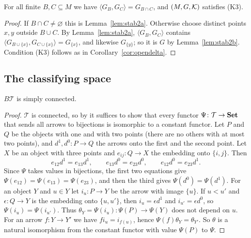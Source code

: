\begin{proposition}\label{prop:open2}
For all finite $B,C\subseteq M$ we have $\langle G_B,G_C\rangle=G_{B\cap C}$, and
$(M,G,\mathcal{K})$ satisfies \textup{(K3)}.
\end{proposition}

\begin{proof}
If $B\cap C\ne\varnothing$ this is Lemma~\ref{lem:stab2a}. Otherwise choose
distinct points $x,y$ outside $B\cup C$. By Lemma~\ref{lem:stab2a},
$\langle G_B,G_C\rangle$ contains
$\langle G_{B\cup\{x\}},G_{C\cup\{x\}}\rangle=G_{\{x\}}$, and likewise
$G_{\{y\}}$; so it is $G$ by Lemma~\ref{lem:stab2b}. Condition (K3) follows as
in Corollary~\ref{cor:opendelta}.
\end{proof}

\subsection{The classifying space}

\begin{lemma}\label{lem:pi1}
$B\mathcal T$ is simply connected.
\end{lemma}

\begin{proof}
$\mathcal T$ is connected, so by \cite[\S 1, Proposition~1]{Quillen} it
suffices to show that every functor $\Psi\colon\mathcal T\to\mathbf{Set}$ that sends
all arrows to bijections is isomorphic to a constant functor. Let $P$ and
$Q$ be the objects with one and with two points (there are no others with at
most two points), and $d^1,d^0\colon P\to Q$ the arrows onto the first and the
second point. Let $X$ be an object with three points and
$e_{ij}\colon Q\to X$ the embedding onto $\{i,j\}$. Then
\[
 e_{12}d^1=e_{13}d^1,\qquad e_{13}d^0=e_{23}d^0,\qquad e_{12}d^0=e_{23}d^1 .
\]
Since $\Psi$ takes values in bijections, the first two equations give
$\Psi(e_{12})=\Psi(e_{13})=\Psi(e_{23})$, and then the third gives
$\Psi(d^0)=\Psi(d^1)$. For an object $Y$ and $u\in Y$ let $i_u\colon P\to Y$ be
the arrow with image $\{u\}$. If $u<u'$ and $\epsilon\colon Q\to Y$ is the
embedding onto $\{u,u'\}$, then $i_u=\epsilon d^1$ and $i_{u'}=\epsilon d^0$, so
$\Psi(i_u)=\Psi(i_{u'})$. Thus $\theta_Y=\Psi(i_u)\colon\Psi(P)\to\Psi(Y)$ does
not depend on $u$. For an arrow $f\colon Y\to Y'$ we have $fi_u=i_{f(u)}$,
hence $\Psi(f)\theta_Y=\theta_{Y'}$. So $\theta$ is a natural isomorphism from
the constant functor with value $\Psi(P)$ to $\Psi$.
\end{proof}

